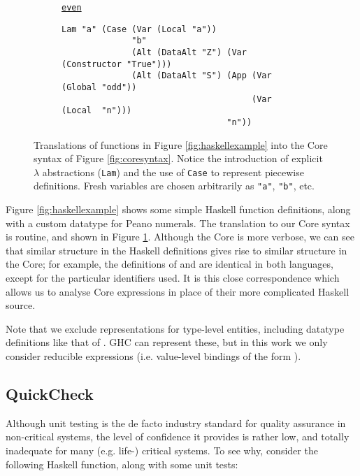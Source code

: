 \begin{figure}
\begin{subfigure}[even]{\textwidth}
    \begin{small}
      \underline{\texttt{even}}
      \begin{verbatim}
Lam "a" (Case (Var (Local "a"))
              "b"
              (Alt (DataAlt "Z") (Var (Constructor "True")))
              (Alt (DataAlt "S") (App (Var (Global "odd"))
                                      (Var (Local  "n")))
                                 "n"))
      \end{verbatim}
    \end{small}
  \end{subfigure}
  \caption{Translations of functions in Figure \ref{fig:haskellexample} into the Core syntax of Figure \ref{fig:coresyntax}. Notice the introduction of explicit $\lambda$ abstractions (\texttt{Lam}) and the use of \texttt{Case} to represent piecewise definitions. Fresh variables are chosen arbitrarily as \texttt{"a"}, \texttt{"b"}, etc.}
  \label{fig:coreexample}
\end{figure}

Figure \ref{fig:haskellexample} shows some simple Haskell function definitions, along with a custom datatype for Peano numerals. The translation to our Core syntax is routine, and shown in Figure \ref{fig:coreexample}. Although the Core is more verbose, we can see that similar structure in the Haskell definitions gives rise to similar structure in the Core; for example, the definitions of  and  are identical in both languages, except for the particular identifiers used. It is this close correspondence which allows us to analyse Core expressions in place of their more complicated Haskell source.

Note that we exclude representations for type-level entities, including datatype definitions like that of . GHC can represent these, but in this work we only consider reducible expressions (i.e. value-level bindings of the form \mbox{}).

\subsection{QuickCheck}
\label{sec:quickcheck}

Although unit testing is the de facto industry standard for quality assurance in non-critical systems, the level of confidence it provides is rather low, and totally inadequate for many (e.g. life-) critical systems. To see why, consider the following Haskell function, along with some unit tests:

